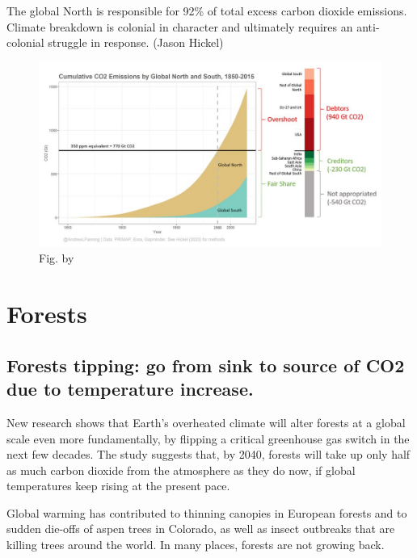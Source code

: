 \documentclass[
]{book}
\begin{document}
The global North is responsible for 92\% of total excess carbon dioxide emissions.
Climate breakdown is colonial in character and ultimately requires an anti-colonial struggle in response. (Jason Hickel)

\begin{figure}
\centering
\includegraphics{fig/CO2_Emissions_Global_North_South.jpeg}
\caption{Fig. by \citet{AndrewFanning}}
\end{figure}

\hypertarget{forests}{%
\chapter{Forests}\label{forests}}

\hypertarget{forests-tipping-go-from-sink-to-source-of-co2-due-to-temperature-increase.}{%
\section{Forests tipping: go from sink to source of CO2 due to temperature increase.}\label{forests-tipping-go-from-sink-to-source-of-co2-due-to-temperature-increase.}}

New research shows that Earth's overheated climate will
alter forests at a global scale even more fundamentally,
by flipping a critical greenhouse gas switch in the next few decades.
The study suggests that, by 2040, forests will take up only
half as much carbon dioxide from the atmosphere as they do now,
if global temperatures keep rising at the present pace.

Global warming has contributed to thinning canopies in European forests
and to sudden die-offs of aspen trees in Colorado,
as well as insect outbreaks that are killing trees around the world.
In many places, forests are not growing back.
\end{document}
